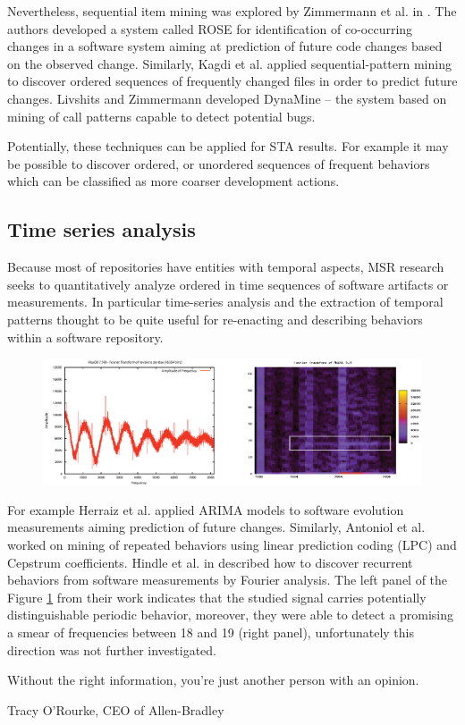 Nevertheless, sequential item mining was explored by Zimmermann et al. in \cite{citeulike:277045}. 
The authors developed a system called ROSE for identification of co-occurring changes in a software system aiming at 
prediction of future code changes based on the observed change. 
Similarly, Kagdi et al. \cite{citeulike:3929070} applied sequential-pattern mining to discover ordered sequences of 
frequently changed files in order to predict future changes. 
Livshits and Zimmermann \cite{citeulike:393158} developed DynaMine -- the system based on mining of call patterns 
capable to detect potential bugs.

Potentially, these techniques can be applied for STA results. For example it may be possible to discover ordered, or
unordered sequences of frequent behaviors which can be classified as more coarser development actions.

\subsection{Time series analysis}
Because most of repositories have entities with temporal aspects, MSR research seeks to quantitatively analyze ordered 
in time sequences of software artifacts or measurements. In particular time-series analysis and the extraction of 
temporal patterns thought to be quite useful for re-enacting and describing behaviors within a software repository. 

\begin{figure}[t!]
   \centering
   \includegraphics[width=145mm]{figures/FourrierMySQL.eps}
   \caption{}
   \label{fig:mysql-fourrier}
\end{figure}

For example Herraiz et al. \cite{citeulike:6544685} applied ARIMA models to software evolution measurements aiming 
prediction of future changes. 
Similarly, Antoniol et al. \cite{citeulike:3378725} worked on mining of repeated behaviors using linear prediction 
coding (LPC) and Cepstrum coefficients. 
Hindle et al. in \cite{citeulike:10377345} described how to discover recurrent behaviors from software measurements 
by Fourier analysis. The left panel of the Figure \ref{fig:mysql-fourrier} from their work indicates that the studied 
signal carries potentially distinguishable periodic behavior, moreover, they were able to detect a promising a smear 
of frequencies between 18 and 19 (right panel), unfortunately this direction was not further investigated.


\epigraph{Without the right information, you're just another person with an opinion.}{Tracy O'Rourke, CEO of Allen-Bradley}